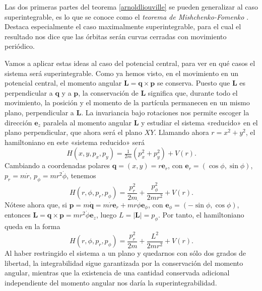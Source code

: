 \documentclass[12pt,a4paper,twoside]{article}
\theoremstyle{definition} \newtheorem{defn}[thm]{Definición}
\theoremstyle{definition} \newtheorem{ejemplo}[thm]{Ejemplo}
\theoremstyle{definition} \newtheorem{ejercicio}[thm]{Ejercicio}
\theoremstyle{remark} \newtheorem*{obs}{Observación}
\newcommand{\vect}[1]{\mathbf{#1}}
\begin{document}
  Las dos primeras partes del teorema \ref{arnoldliouville} se pueden generalizar al caso superintegrable, es lo que se conoce como el \emph{teorema de Mishchenko-Fomenko} \cite{mishchenko}. Destaca especialmente el caso maximalmente superintegrable, para el cual el resultado nos dice que las órbitas serán curvas cerradas con movimiento periódico.

  Vamos a aplicar estas ideas al caso del potencial central, para ver en qué casos el sistema será superintegrable. Como ya hemos visto, en el movimiento en un potencial central, el momento angular $\vect{L}=\vect{q}\times \vect{p}$ se conserva. Puesto que $\vect{L}$ es perpendicular a $\vect{q}$ y a $\vect{p}$, la conservación de $\vect{L}$ significa que, durante todo el movimiento, la posición y el momento de la partícula permanecen en un mismo plano, perpendicular a $\vect{L}$. La invariancia bajo rotaciones nos permite escoger la dirección $\vect{e}_z$ paralela al momento angular $\vect{L}$ y estudiar el sistema «reducido» en el plano perpendicular, que ahora será el plano $XY$. Llamando ahora $r=x^2+y^2$, el hamiltoniano en este «sistema reducido» será
  \begin{equation}
    H(x,y,p_x,p_y)= \tfrac{1}{2m}(p_x^2+p_y^2)+V(r).
  \end{equation}
  Cambiando a coordenadas polares $\vect{q}=(x,y)=r\vect{e}_{r}$, con $\vect{e}_r=(\cos \phi, \sin \phi)$, $p_r=m\dot r$, $p_{\phi}=mr^2\dot \phi$, tenemos
  \begin{equation}
    H(r,\phi,p_r,p_{\phi})=\frac{p_r^2}{2m}+\frac{p_{\phi}^2}{2mr^2}+V(r). 
  \end{equation}
  Nótese ahora que, si $\vect{p}=m\dot{\vect{q}}=m\dot r \vect{e}_r + mr \dot \phi \vect{e}_{\phi}$, con $\vect{e}_{\phi}=(-\sin \phi,\cos \phi)$, entonces $\vect{L}=\vect{q}\times \vect{p}=mr^2\dot \phi \vect{e}_z$, luego $L=|\vect{L}|=p_{\phi}$. Por tanto, el hamiltoniano queda en la forma
  \begin{equation}
    H(r,\phi,p_r,p_{\phi})=\frac{p_r^2}{2m}+\frac{L^2}{2mr^2}+V(r). 
  \end{equation}
  Al haber restringido el sistema a un plano y quedarnos con sólo dos grados de libertad, la integrabilidad sigue garantizada por la conservación del momento angular, mientras que la existencia de una cantidad conservada adicional independiente del momento angular nos daría la superintegrabilidad.
\end{document}
